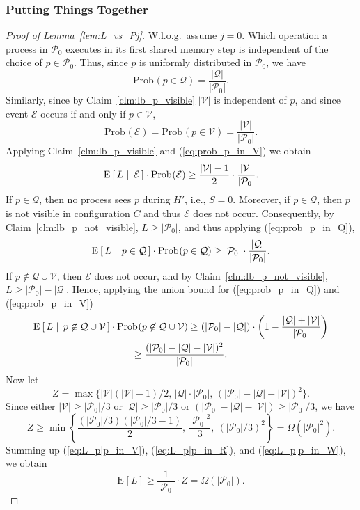 \documentclass[11pt,letterpaper]{article}
\makeatletter
\newcommand{\paren}[1]{{\left({#1}\right)}}
\providecommand{\@prob}{{\mathrm{Prob}}}
\newcommand{\Prob}[2][]{\@prob_{#1}\paren{#2}}
\providecommand{\@Exp}{{\mathrm{E}}}
\newcommand{\Exp}[2][]{\@Exp_{#1}\left[{#2}\right]}
\newcommand{\CondExp}[3][]{\Exp[#1]{\,#2\,\left\vert\vphantom{#2#3}\right.\,#3\,}}
\newcommand{\EE}{\mathcal{E}}
\newcommand{\PP}{\mathcal{P}}
\newcommand{\QQ}{\mathcal{Q}}
\newcommand{\VV}{\mathcal{V}}
\makeatother
\begin{document}
\subsubsection{Putting Things Together}
\begin{proof}[Proof of Lemma~\ref{lem:L_vs_Pj}]
  W.l.o.g.\ assume $j=0$.
  Which operation a process in $\PP_0$ executes in its first shared memory step is independent of the choice of $p\in\PP_0$.
  Thus, since $p$ is uniformly distributed in $\PP_0$, we have
  \begin{equation}\label{eq:prob_p_in_Q}
    \Prob{p\in\QQ}=\frac{|\QQ|}{|\PP_0|}.
  \end{equation}
  Similarly, since by Claim~\ref{clm:lb_p_visible} $|\VV|$ is independent of $p$, and since event $\EE$ occurs if and only if $p\in\VV$,
  \begin{equation}\label{eq:prob_p_in_V}
    \Prob{\EE}=\Prob{p\in\VV}=\frac{|\VV|}{|\PP_0|}.
  \end{equation}
  Applying Claim~\ref{clm:lb_p_visible} and (\ref{eq:prob_p_in_V}) we obtain
  \begin{equation}\label{eq:L_p|p_in_V}
    \CondExp{L}{\EE}\cdot\Prob{\EE}
    \geq
    \frac{|\VV|-1}{2}\cdot\frac{|\VV|}{|\PP_0|}.
  \end{equation}
  If $p\in\QQ$, then no process sees $p$ during $H'$, i.e., $S=0$.
  Moreover, if $p\in\QQ$, then $p$ is not visible in configuration $C$ and thus $\EE$ does not occur.
  Consequently, by Claim~\ref{clm:lb_p_not_visible}, $L\geq|\PP_0|$, and thus applying
  (\ref{eq:prob_p_in_Q}),
  \begin{equation}\label{eq:L_p|p_in_R}
    \CondExp{L}{p\in\QQ}\cdot\Prob{p\in\QQ}
    \geq
    |\PP_0|\cdot\frac{|\QQ|}{|\PP_0|}.
  \end{equation}
  If $p\not\in\QQ\cup\VV$, then $\EE$ does not occur, and by Claim~\ref{clm:lb_p_not_visible}, $L\geq |\PP_0|-|\QQ|$.
  Hence, applying the union bound for (\ref{eq:prob_p_in_Q}) and (\ref{eq:prob_p_in_V})
  \begin{multline}\label{eq:L_p|p_in_W}
    \CondExp{L}{p\not\in\QQ\cup\VV}\cdot\Prob{p\not\in\QQ\cup\VV}
    \geq
    (|\PP_0|-|\QQ|)\cdot\paren{1-\frac{|\QQ|+|\VV|}{|\PP_0|}}
    \\ \geq
    \frac{(|\PP_0|-|\QQ|-|\VV|)^2}{|\PP_0|}.
  \end{multline}
  Now let
  \begin{displaymath}
    Z=\max\bigl\{|\VV|(|\VV|-1)/2,\,|\QQ|\cdot |\PP_0|,\,(|\PP_0|-|\QQ|-|\VV|)^2\bigr\}.
  \end{displaymath}
  Since either $|\VV|\geq |\PP_0|/3$ or $|\QQ|\geq |\PP_0|/3$ or $(|\PP_0|-|\QQ|-|\VV|)\geq |\PP_0|/3$, we have
  \begin{displaymath}
    Z\geq\min\left\{\frac{(|\PP_0|/3)(|\PP_0|/3-1)}{2},\ \frac{|\PP_0|^2}{3},\ (|\PP_0|/3)^2\right\}=\Omega(|\PP_0|^2).
  \end{displaymath}
  Summing up (\ref{eq:L_p|p_in_V}), (\ref{eq:L_p|p_in_R}), and (\ref{eq:L_p|p_in_W}), we obtain
  \begin{displaymath}
    \Exp{L}
    \geq
    \frac{1}{|\PP_0|}\cdot Z
    =
    \Omega(|\PP_0|).
  \end{displaymath}
\end{proof}
\end{document}
